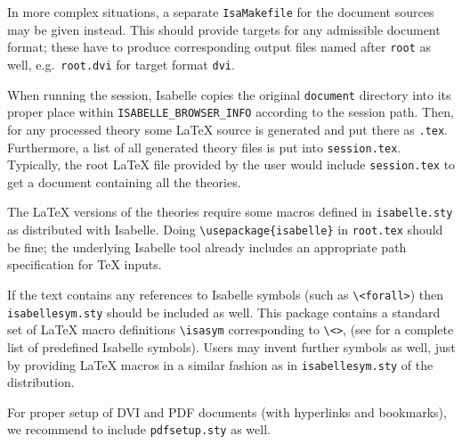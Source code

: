 \begin{isabellebody}
\begin{isamarkuptext}
  In more complex situations, a separate \verb|IsaMakefile| for
  the document sources may be given instead.  This should provide
  targets for any admissible document format; these have to produce
  corresponding output files named after \verb|root| as well,
  e.g.\ \verb|root.dvi| for target format \verb|dvi|.

  \medskip When running the session, Isabelle copies the original
  \verb|document| directory into its proper place within
  \verb|ISABELLE_BROWSER_INFO| according to the session path.
  Then, for any processed theory  some {\LaTeX} source is
  generated and put there as \verb|.tex|.
  Furthermore, a list of all generated theory files is put into
  \verb|session.tex|.  Typically, the root {\LaTeX} file provided
  by the user would include \verb|session.tex| to get a document
  containing all the theories.

  The {\LaTeX} versions of the theories require some macros defined in
  \verb|isabelle.sty| as distributed with Isabelle.  Doing
  \verb|\usepackage{isabelle}| in \verb|root.tex| should
  be fine; the underlying Isabelle \hyperlink{tool.latex}{\mbox{}} tool already includes
  an appropriate path specification for {\TeX} inputs.

  If the text contains any references to Isabelle symbols (such as
  \verb|\|\verb|<forall>|) then \verb|isabellesym.sty| should be included as well.  This package contains
  a standard set of {\LaTeX} macro definitions \verb|\isasym| corresponding to \verb|\|\verb|<|\verb|>|, (see  for a
  complete list of predefined Isabelle symbols).  Users may invent
  further symbols as well, just by providing {\LaTeX} macros in a
  similar fashion as in \verb|isabellesym.sty| of the
  distribution.

  For proper setup of DVI and PDF documents (with hyperlinks and
  bookmarks), we recommend to include \verb|pdfsetup.sty| as
  well.


\end{isamarkuptext}
\end{isabellebody}
